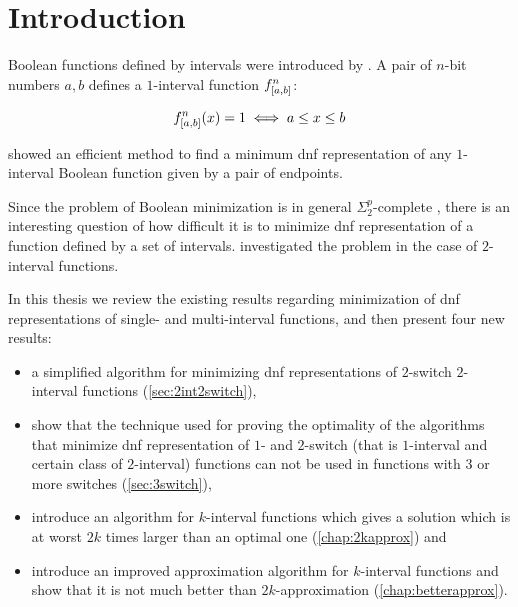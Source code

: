 \chapter*{Introduction}


Boolean functions defined by intervals were introduced
by \citet{Schieber2005154}.
A pair of $n$-bit numbers $a, b$
defines a $1$-interval function
$f^{n}_{[a, b]}$:

$$
f^{n}_{[a, b]} (x) = 1
\iff a \leq x \leq b
$$

\citeauthor{Schieber2005154} showed an efficient method
to find a minimum \acrfull{dnf} representation
of any $1$-interval Boolean function
given by a pair of endpoints.\citep{Schieber2005154}

Since the problem of Boolean minimization is in general
$\Sigma_2^p$-complete \citep{Umans1998},
there is an interesting question of how difficult it is
to minimize \acrshort{dnf} representation of
a function defined by a set of intervals.
\citeauthor{Dubovsky2012} investigated the problem
in the case of $2$-interval functions.\citep{Dubovsky2012}

In this thesis we review the existing results regarding
minimization of \acrshort{dnf} representations of
single- and multi-interval functions,
and then present four new results:

\begin{itemize}
\item a simplified algorithm
for minimizing \acrshort{dnf} representations
of $2$-switch
$2$-interval functions (\cref{sec:2int2switch}),
\item
show that the technique used for proving the optimality
of the algorithms that minimize
\acrshort{dnf} representation
of $1$- and $2$-switch
(that is $1$-interval and certain class of $2$-interval)
functions
can not be used in
functions with $3$ or more switches
(\cref{sec:3switch}),
\item
introduce an algorithm
for $k$-interval functions
which gives a solution which is at worst
$2k$ times larger than an optimal one
(\cref{chap:2kapprox}) and
\item
introduce an improved approximation algorithm
for $k$-interval functions
and show that it is not much better than $2k$-approximation
(\cref{chap:betterapprox}).
\end{itemize}
